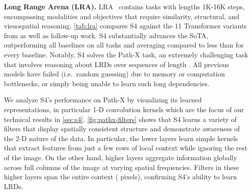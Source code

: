 \documentclass{article}
\newcommand{\methodabbrv}{S4}
\begin{document}
\textbf{Long Range Arena (LRA).}
LRA~\citep{tay2021long} contains  tasks with lengths 1K-16K steps, encompassing modalities and objectives that require similarity, structural, and visuospatial reasoning.
\cref{tab:lra} compares \methodabbrv{} against the 11 Transformer variants from \citet{tay2021long} as well as follow-up work.
\methodabbrv{} substantially advances the SoTA, outperforming all baselines on all tasks and averaging  compared to less than  for every baseline.
Notably, \methodabbrv{} solves the Path-X task, an extremely challenging task
that involves reasoning about LRDs over sequences of length .
All previous models have failed (i.e.\ random guessing) due to memory or computation bottlenecks, or simply being unable to learn such long dependencies.

We analyze \methodabbrv's performance on Path-X by visualizing its learned representations,
in particular 1-D convolution kernels 
which are the focus of our technical results in \cref{sec:s4}.
\cref{fig:pathx-filters} shows that \methodabbrv{} learns a variety of filters that display spatially consistent structure
and demonstrate awareness of the 2-D nature of the data.
In particular, the lower layers learn simple kernels that extract features from just a few rows of local context while ignoring the rest of the image.
On the other hand, higher layers aggregate information globally across full columns of the image at varying spatial frequencies.
Filters in these higher layers span the entire context ( pixels), confirming \methodabbrv's ability to learn LRDs.
\end{document}
